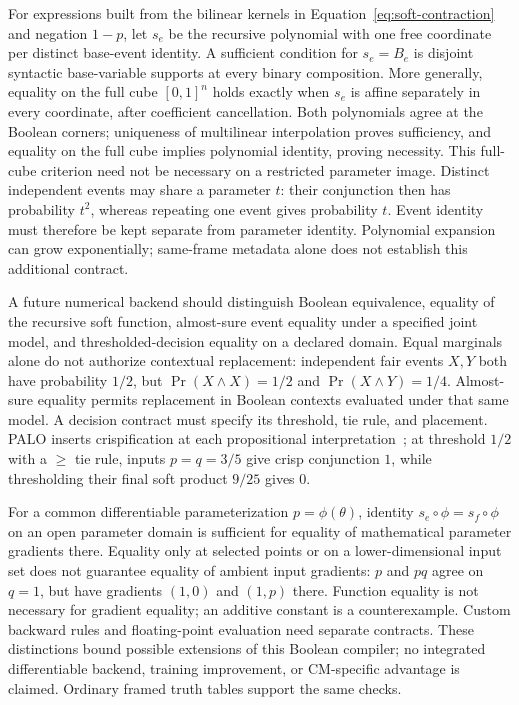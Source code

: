 \documentclass[10pt]{article}
\theoremstyle{plain}
\theoremstyle{definition}
\theoremstyle{remark}
\begin{document}
For expressions built from the bilinear kernels in Equation~\eqref{eq:soft-contraction} and negation $1-p$, let $s_e$ be the recursive polynomial with one free coordinate per distinct base-event identity. A sufficient condition for $s_e=B_e$ is disjoint syntactic base-variable supports at every binary composition. More generally, equality on the full cube $[0,1]^n$ holds exactly when $s_e$ is affine separately in every coordinate, after coefficient cancellation. Both polynomials agree at the Boolean corners; uniqueness of multilinear interpolation proves sufficiency, and equality on the full cube implies polynomial identity, proving necessity. This full-cube criterion need not be necessary on a restricted parameter image. Distinct independent events may share a parameter $t$: their conjunction then has probability $t^2$, whereas repeating one event gives probability $t$. Event identity must therefore be kept separate from parameter identity. Polynomial expansion can grow exponentially; same-frame metadata alone does not establish this additional contract.

A future numerical backend should distinguish Boolean equivalence, equality of the recursive soft function, almost-sure event equality under a specified joint model, and thresholded-decision equality on a declared domain. Equal marginals alone do not authorize contextual replacement: independent fair events $X,Y$ both have probability $1/2$, but $\Pr(X\land X)=1/2$ and $\Pr(X\land Y)=1/4$. Almost-sure equality permits replacement in Boolean contexts evaluated under that same model. A decision contract must specify its threshold, tie rule, and placement. PALO inserts crispification at each propositional interpretation~\cite[Section~3.7]{Stehr2022}; at threshold $1/2$ with a $\geq$ tie rule, inputs $p=q=3/5$ give crisp conjunction $1$, while thresholding their final soft product $9/25$ gives $0$.

For a common differentiable parameterization $p=\phi(\theta)$, identity $s_e\circ\phi=s_f\circ\phi$ on an open parameter domain is sufficient for equality of mathematical parameter gradients there. Equality only at selected points or on a lower-dimensional input set does not guarantee equality of ambient input gradients: $p$ and $pq$ agree on $q=1$, but have gradients $(1,0)$ and $(1,p)$ there. Function equality is not necessary for gradient equality; an additive constant is a counterexample. Custom backward rules and floating-point evaluation need separate contracts. These distinctions bound possible extensions of this Boolean compiler; no integrated differentiable backend, training improvement, or CM-specific advantage is claimed. Ordinary framed truth tables support the same checks.
\end{document}
